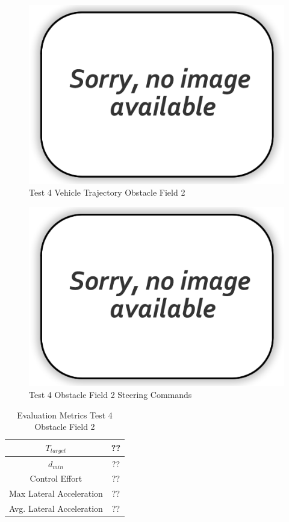 \documentclass[12pt,twocolumn]{article}
\begin{document}
\begin{figure}
	\centering
	\includegraphics[width=\columnwidth]{Figs/no-image.png}
	\caption{\small Test 4 Vehicle Trajectory Obstacle Field 2}  
	\label{fig:Test4_Obst2}
\end{figure}

\begin{figure}
	\centering
	\includegraphics[width=\columnwidth]{Figs/no-image.png}
	\caption{\small Test 4 Obstacle Field 2 Steering Commands}  
	\label{fig:Test4_Obst2_Steer}
\end{figure}

\begin{table}
\begin{center}
	\begin{tabular}{||c |c||} 
		\hline
		$T_{target}$ & ??\\ 
		\hline
		$d_{min}$ & ??\\
		\hline
		Control Effort & ??\\
		\hline
		Max Lateral Acceleration & ??\\
		\hline
		Avg. Lateral Acceleration & ??\\
		\hline
	\end{tabular}
\end{center}
\caption{Evaluation Metrics Test 4 Obstacle Field 2}
\label{t:EvalTest4Obst2}
\end{table}
\end{document}
